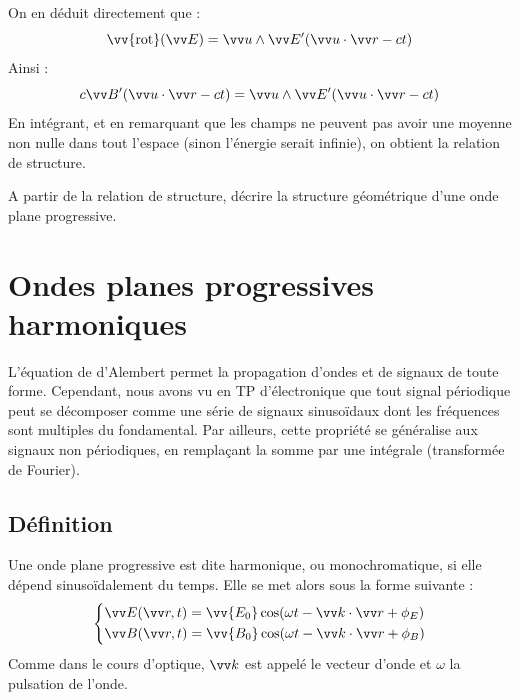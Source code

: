 \documentclass[11pt,fleqn]{book} %
\newcommand{\rot}{\vv{\mathrm{rot}}}
\begin{document}
\begin{demonstration}
\begin{equation}
	\end{equation}
	On en déduit directement que :
	\begin{equation}
		\rot(\vv E) = \vv u \wedge \vv E'(\vv u \cdot \vv r - c t)
	\end{equation}
	Ainsi :
	\begin{equation}
		c \vv B'(\vv u \cdot \vv r - c t) = \vv u \wedge \vv E'(\vv u \cdot \vv r - c t)
	\end{equation}
	En intégrant, et en remarquant que les champs ne peuvent pas avoir une moyenne non nulle dans tout l'espace (sinon l'énergie serait infinie), on obtient la relation de structure.
\end{demonstration}

\begin{capex}
	A partir de la relation de structure, décrire la structure géométrique d'une onde plane progressive.
\end{capex}

\section{Ondes planes progressives harmoniques}

L'équation de d'Alembert permet la propagation d'ondes et de signaux de toute forme. Cependant, nous avons vu en TP d'électronique que tout signal périodique peut se décomposer comme une série de signaux sinusoïdaux dont les fréquences sont multiples du fondamental. Par ailleurs, cette propriété se généralise aux signaux non périodiques, en remplaçant la somme par une intégrale (transformée de Fourier).

\subsection{Définition}

\begin{definition}
	Une onde plane progressive est dite harmonique, ou monochromatique, si elle dépend sinusoïdalement du temps. Elle se met alors sous la forme suivante :
	\begin{equation}
		\begin{dcases}
			\vv E(\vv r,t) = \vv{E_0} \cos(\omega t - \vv k \cdot \vv r + \phi_E) \\
			\vv B(\vv r,t) = \vv{B_0} \cos(\omega t - \vv k \cdot \vv r + \phi_B)
		\end{dcases}
	\end{equation}
	Comme dans le cours d'optique, $\vv k$ est appelé le vecteur d'onde et $\omega$ la pulsation de l'onde.
\end{definition}
\end{document}
